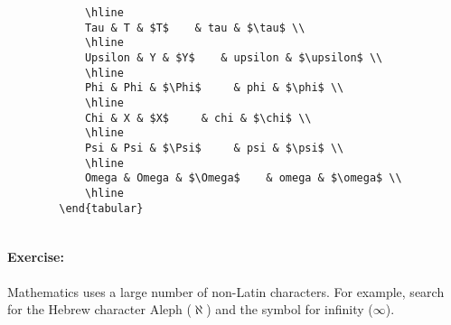 \begin{verbatim}
            \hline
            Tau & T & $T$    & tau & $\tau$ \\
            \hline
            Upsilon & Y & $Y$    & upsilon & $\upsilon$ \\
            \hline
            Phi & Phi & $\Phi$     & phi & $\phi$ \\
            \hline
            Chi & X & $X$     & chi & $\chi$ \\
            \hline
            Psi & Psi & $\Psi$     & psi & $\psi$ \\
            \hline
            Omega & Omega & $\Omega$    & omega & $\omega$ \\
            \hline
        \end{tabular}
    
        \end{verbatim}

        \paragraph{Exercise:} Mathematics uses a large number of non-Latin characters. For example, search for the Hebrew character Aleph ($\aleph$) and the symbol for infinity ($\infty$).

